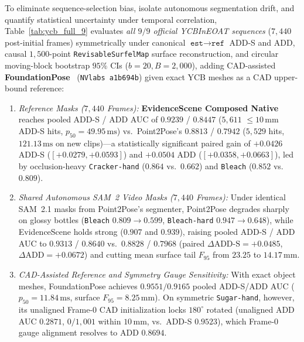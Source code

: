 \documentclass{evidencescene}
\begin{document}
To eliminate sequence-selection bias, isolate autonomous segmentation drift, and quantify statistical uncertainty under temporal correlation, Table~\ref{tab:ycb_full_9} evaluates \emph{all $9/9$ official YCBInEOAT sequences} ($7{,}440$ post-initial frames) symmetrically under canonical $\texttt{est}\to\texttt{ref}$ ADD-S and ADD, causal $1{,}500$-point \texttt{RevisableSurfelMap} surface reconstruction, and circular moving-block bootstrap $95\%$ CIs ($b=20, B=2{,}000$), adding CAD-assisted \textbf{FoundationPose}~\cite{foundationpose} (\texttt{NVlabs a1b694b}) given exact YCB meshes as a CAD upper-bound reference:
\begin{enumerate}
    \item \emph{Reference Masks ($7{,}440$ Frames):} \textbf{EvidenceScene Composed Native} reaches pooled ADD-S / ADD AUC of $\mathbf{0.9239}$ / $\mathbf{0.8447}$ ($5{,}611$ $\le 10\,\mathrm{mm}$ ADD-S hits, $p_{50}=49.95\,\mathrm{ms}$) vs.\ Point2Pose's $0.8813$ / $0.7942$ ($5{,}529$ hits, $121.13\,\mathrm{ms}$ on new clips)---a statistically significant paired gain of $\mathbf{+0.0426}$ ADD-S ($[+0.0279,+0.0593]$) and $\mathbf{+0.0504}$ ADD ($[+0.0358,+0.0663]$), led by occlusion-heavy \texttt{Cracker-hand} ($0.864$ vs.\ $0.662$) and \texttt{Bleach} ($0.852$ vs.\ $0.809$).
    \item \emph{Shared Autonomous SAM~2 Video Masks ($7{,}440$ Frames):} Under identical SAM~2.1 masks from Point2Pose's segmenter, Point2Pose degrades sharply on glossy bottles (\texttt{Bleach} $0.809\to 0.599$, \texttt{Bleach-hard} $0.947\to 0.648$), while EvidenceScene holds strong ($0.907$ and $0.939$), raising pooled ADD-S / ADD AUC to $\mathbf{0.9313}$ / $\mathbf{0.8640}$ vs.\ $0.8828$ / $0.7968$ (paired $\Delta\text{ADD-S}=+0.0485$, $\Delta\text{ADD}=+0.0672$) and cutting mean surface tail $F_{95}$ from $23.25$ to $\mathbf{14.17\,\mathrm{mm}}$.
    \item \emph{CAD-Assisted Reference and Symmetry Gauge Sensitivity:} With exact object meshes, FoundationPose achieves $0.9551/0.9165$ pooled ADD-S/ADD AUC ($p_{50}=11.84\,\mathrm{ms}$, surface $F_{95}=8.25\,\mathrm{mm}$). On symmetric \texttt{Sugar-hand}, however, its unaligned Frame-0 CAD initialization locks $180^\circ$ rotated (unaligned ADD AUC $0.2871$, $0/1{,}001$ within $10\,\mathrm{mm}$, vs.\ ADD-S $0.9523$), which Frame-0 gauge alignment resolves to ADD $0.8694$.
\end{enumerate}


\end{document}
